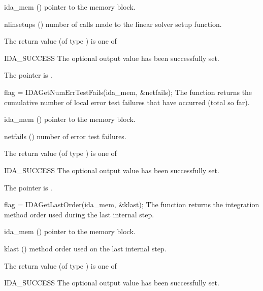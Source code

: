 {{\begin{args}[nlinsetups]
  \item[ida\_mem] ()
    pointer to the {\idas} memory block.
  \item[nlinsetups] ()
    number of calls made to the linear solver setup function.
  \end{args}
}
{
  The return value  (of type ) is one of
  \begin{args}
  \item[IDA\_SUCCESS] 
    The optional output value has been successfully set.
  \item[\Id{IDA\_MEM\_NULL}]
    The  pointer is .
  \end{args}
}
{}
{
  flag = IDAGetNumErrTestFails(ida\_mem, \&netfails);
}
{
  The function  returns the
  cumulative number of local error test failures that have occurred 
  (total so far).
}
{
  \begin{args}[netfails]
  \item[ida\_mem] ()
    pointer to the {\idas} memory block.
  \item[netfails] ()
    number of error test failures.
  \end{args}
}
{
  The return value  (of type ) is one of
  \begin{args}
  \item[IDA\_SUCCESS] 
    The optional output value has been successfully set.
  \item[\Id{IDA\_MEM\_NULL}]
    The  pointer is .
  \end{args}
}
{}
{
  flag = IDAGetLastOrder(ida\_mem, \&klast);
}
{
  The function  returns the
  integration method order used during the last internal step.
}
{
  \begin{args}
  \item[ida\_mem] ()
    pointer to the {\idas} memory block.
  \item[klast] ()
    method order used on the last internal step.
  \end{args}
}
{
  The return value  (of type ) is one of
  \begin{args}
  \item[IDA\_SUCCESS] 
    The optional output value has been successfully set.
  \item[\Id{IDA\_MEM\_NULL}]

\end{args}}}
